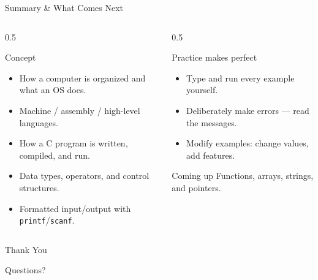 \documentclass[aspectratio=169]{beamer}
\begin{document}
	\begin{frame}{Summary \& What Comes Next}
		\begin{columns}[T]
			\begin{column}{0.5\textwidth}
				\begin{block}{Concept}
					\begin{itemize}\small
						\item How a computer is organized and what an OS does.
						\item Machine / assembly / high-level languages.
						\item How a C program is written, compiled, and run.
						\item Data types, operators, and control structures.
						\item Formatted input/output with \texttt{printf}/\texttt{scanf}.
					\end{itemize}
				\end{block}
			\end{column}
			\begin{column}{0.5\textwidth}
				\begin{block}{Practice makes perfect}
					\begin{itemize}\small
						\item Type and run every example yourself.
						\item Deliberately make errors --- read the messages.
						\item Modify examples: change values, add features.
					\end{itemize}
				\end{block}
				\begin{block}{Coming up}
					\small Functions, arrays, strings, and pointers.
				\end{block}
			\end{column}
		\end{columns}
	\end{frame}
	
	\begin{frame}
		\centering
		\Huge Thank You
		\vspace{0.5cm}
		
		\normalsize Questions?
	\end{frame}
	
	
\end{document}
